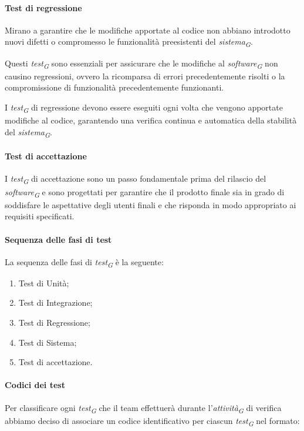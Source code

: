 \paragraph{Test di regressione}
Mirano a garantire che le modifiche apportate al codice non abbiano introdotto nuovi difetti o compromesso le funzionalità preesistenti del \textit{sistema}\textsubscript{\textit{G}}. 

Questi \textit{test}\textsubscript{\textit{G}} sono essenziali per assicurare che le modifiche al \textit{software}\textsubscript{\textit{G}} non causino regressioni, ovvero la ricomparsa di errori precedentemente risolti o la compromissione di funzionalità precedentemente funzionanti. 

I \textit{test}\textsubscript{\textit{G}} di regressione devono essere eseguiti ogni volta che vengono apportate modifiche al codice, garantendo una verifica continua e automatica della stabilità del \textit{sistema}\textsubscript{\textit{G}}. 

\paragraph{Test di accettazione}
I \textit{test}\textsubscript{\textit{G}} di accettazione sono un passo fondamentale prima del rilascio del \textit{software}\textsubscript{\textit{G}} e sono progettati per garantire che il prodotto finale sia in grado di soddisfare le aspettative degli utenti finali e che risponda in modo appropriato ai requisiti specificati. 

\paragraph{Sequenza delle fasi di test}
La sequenza delle fasi di \textit{test}\textsubscript{\textit{G}} è la seguente:

\begin{enumerate}
    \item Test di Unità;
    \item Test di Integrazione;
    \item Test di Regressione;
    \item Test di Sistema;
    \item Test di accettazione.
\end{enumerate}

\paragraph{Codici dei test}
Per classificare ogni \textit{test}\textsubscript{\textit{G}} che il team effettuerà durante l'\textit{attività}\textsubscript{\textit{G}} di verifica abbiamo deciso di associare un codice identificativo per ciascun \textit{test}\textsubscript{\textit{G}} nel formato: 

